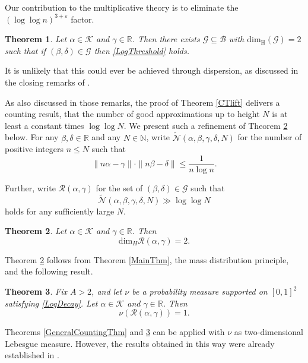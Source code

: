 \documentclass[12pt, reqno]{amsart}
\newtheorem{thm}{Theorem}[section]
\theoremstyle{definition}
\theoremstyle{remark}
\numberwithin{equation}{section}
\def\alp{{\alpha}} \def\bfalp{{\boldsymbol \alpha}}
\def\bet{{\beta}}  \def\bfbet{{\boldsymbol \beta}}
\def\gam{{\gamma}} \def\Gam{{\Gamma}}
\def\del{{\delta}} \def\Del{{\Delta}}
\def\eps{\varepsilon}
\def\le{\leqslant} \def\ge{\geqslant}
\def\leq{\leqslant}
\def \bN {\mathbb N}
\def \bR {\mathbb R}
\def \cB {\mathcal B}
\def \cG {\mathcal G}
\def \cK {\mathcal K}
\def \cN {\mathcal N}
\def \cR {\mathcal R}
\def \dim {\mathrm{dim}}
\def \dimH {\dim_{\mathrm{H}}}
\begin{document}
	Our contribution to the multiplicative theory is to eliminate the 
	$(\log \log n)^{3 + \eps}$ factor.
	
	\begin{thm} \label{MultThm}
		Let $\alp \in \cK$ and $\gam \in \bR$. Then there exists $\cG \subseteq \cB$ with $\dimH(\cG) = 2$ such that if $(\bet, \del) \in \cG$ then
		\eqref{LogThreshold}
		holds.
	\end{thm}
	
	\noindent It is unlikely that this could ever be achieved through dispersion, as discussed in the closing remarks of \cite{CT}. 
	
	As also discussed in those remarks, the proof of Theorem \ref{CTlift} delivers a counting result, that the number of good approximations up to height $N$ is at least a constant times $\log \log N$. We present such a refinement of Theorem \ref{MultThmQ} below. For any $\bet, \del \in \bR$ and any $N \in \bN$, write $\widetilde{\cN}(\alpha,\beta,\gamma,\delta,N)$
	for the number of positive integers $n \le N$ such that
	\begin{equation} \label{strong_Littlewood_ie}
		\| n \alp - \gam \| \cdot
		\| n \bet - \del \| \leq
		\frac{1}
		{n\log n}.
	\end{equation}
	
	Further, write $\cR(\alp, \gam)$ for the set of $(\bet, \del) \in \cG$ such that
	\[
	\widetilde{\cN}(\alpha,\beta,\gamma,\delta,N)
	\gg \log\log N
	\]
	holds for any sufficiently large $N$.
	
	\begin{thm} \label{MultThmQ}
		Let $\alp \in \cK$ and $\gam \in \bR$. Then
		\[
		\dim_H\cR(\alpha,\gamma)
		=2.
		\]
	\end{thm}
	
	Theorem \ref{MultThmQ} follows from Theorem \ref{MainThm}, the mass distribution principle, and the following result.
	
	\begin{thm}
		\label{GeneralMultThmQ}
		Fix $A > 2$, and let $\nu$ be a probability measure supported on $[0,1]^2$ satisfying \eqref{LogDecay}. Let $\alp \in \cK$ and $\gam \in \bR$. Then
		\[
		\nu(\cR(\alpha,\gamma))
		= 1.
		\]
	\end{thm}
	
	Theorems \ref{GeneralCountingThm} and \ref{GeneralMultThmQ} can be applied with $\nu$ as two-dimensional Lebesgue measure. However, the results obtained in this way were already established in \cite{PVZZ2022}.
	
\end{document}
